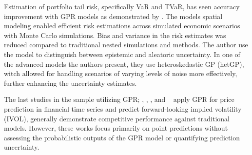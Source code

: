 Estimation of portfolio tail risk, specifically VaR and TVaR, has seen accuracy improvement with GPR models as demonstrated by \textcite{Risk2018gpr}. The models spatial modeling enabled efficient risk estimations across simulated economic scenarios with Monte Carlo simulations. Bias and variance in the risk estimates was reduced compared to traditional nested simulations and methods. The author use the model to distinguish between epistemic and aleatoric uncertainty. In one of the advanced models the authors present, they use heteroskedastic GP (hetGP), witch allowed for handling scenarios of varying levels of noise more effectively, further enhancing the uncertainty estimates. 

The last studies in the sample utilizing GPR;  \textcite{Papaioannou2022gpr}, \textcite{Zmuk2020gpr}, \textcite{Park2014gpr}, and ~\textcite{DeSpiegeleer2018gpr} apply GPR for price prediction in financial time series and \textcite{Hocht2024gpr} predict forward-looking implied volatility (IVOL), generally demonstrate competitive performance against traditional models. However, these works focus primarily on point predictions without assessing the probabilistic outputs of the GPR model or quantifying prediction uncertainty.






